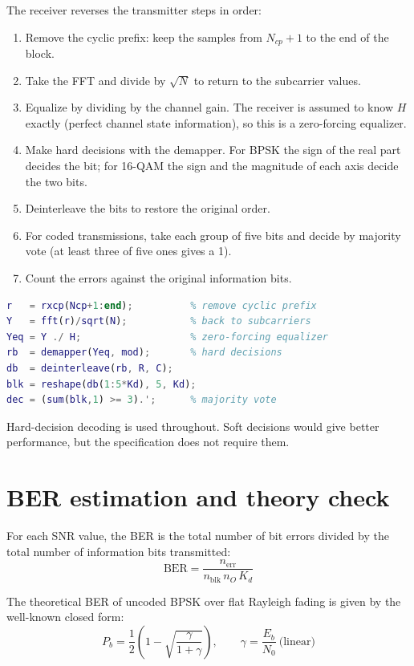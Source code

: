 \documentclass[11pt,a4paper]{article}
\begin{document}
The receiver reverses the transmitter steps in order:
\begin{enumerate}[leftmargin=*]
  \item Remove the cyclic prefix: keep the samples from $N_{cp}+1$ to the end of the block.
  \item Take the FFT and divide by $\sqrt{N}$ to return to the subcarrier values.
  \item Equalize by dividing by the channel gain. The receiver is assumed to know $H$ exactly (perfect channel state information), so this is a zero-forcing equalizer.
  \item Make hard decisions with the demapper. For BPSK the sign of the real part decides the bit; for 16-QAM the sign and the magnitude of each axis decide the two bits.
  \item Deinterleave the bits to restore the original order.
  \item For coded transmissions, take each group of five bits and decide by majority vote (at least three of five ones gives a 1).
  \item Count the errors against the original information bits.
\end{enumerate}

\begin{lstlisting}[language=Matlab]
r   = rxcp(Ncp+1:end);          % remove cyclic prefix
Y   = fft(r)/sqrt(N);           % back to subcarriers
Yeq = Y ./ H;                   % zero-forcing equalizer
rb  = demapper(Yeq, mod);       % hard decisions
db  = deinterleave(rb, R, C);
blk = reshape(db(1:5*Kd), 5, Kd);
dec = (sum(blk,1) >= 3).';      % majority vote
\end{lstlisting}

Hard-decision decoding is used throughout. Soft decisions would give better performance, but the specification does not require them.

\section{BER estimation and theory check}
\label{sec:theory}

For each SNR value, the BER is the total number of bit errors divided by the total number of information bits transmitted:
\[
  \mathrm{BER} = \frac{n_{\mathrm{err}}}{n_{\mathrm{blk}}\, n_O\, K_d}
\]

The theoretical BER of uncoded BPSK over flat Rayleigh fading is given by the well-known closed form:
\[
  P_b = \frac{1}{2}\left(1 - \sqrt{\frac{\gamma}{1+\gamma}}\right), \qquad \gamma = \frac{E_b}{N_0}\ \text{(linear)}
\]
\end{document}
